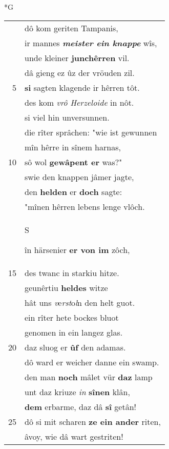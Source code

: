 \documentclass[8pt,a4paper,notitlepage]{article}
\begin{document}
\newpage
\begin{table}[ht]
\begin{minipage}[t]{0.5\linewidth}
\small
\begin{center}*G
\end{center}
\begin{tabular}{rl}
 & dô kom geriten Tampanis,\\ 
 & ir mannes \textit{\textbf{meister ein knappe}} wîs,\\ 
 & unde kleiner \textbf{junchêrren} vil.\\ 
 & dâ gieng ez ûz der vröuden zil.\\ 
5 & \textbf{si} sagten klagende ir hêrren tôt.\\ 
 & des kom \textit{vrô} \textit{Herzeloide} in nôt.\\ 
 & si viel hin unversunnen.\\ 
 & die rîter sprâchen: "wie ist gewunnen\\ 
 & mîn hêrre in sînem harnas,\\ 
10 & sô wol \textbf{gewâpent er} was?"\\ 
 & swie den knappen jâmer jagte,\\ 
 & den \textbf{helden} er \textbf{doch} sagte:\\ 
 & "mînen hêrren lebens lenge vlôch.\\ 
 & \begin{large}S\end{large}în härsenier \textbf{er von im} zôch,\\ 
15 & des twanc in starkiu hitze.\\ 
 & geunêrtiu \textbf{heldes} witze\\ 
 & hât uns \textit{v}e\textit{rst}o\textit{l}n den helt guot.\\ 
 & ein rîter hete bockes bluot\\ 
 & genomen in ein langez glas.\\ 
20 & daz sluog er \textbf{ûf} den adamas.\\ 
 & dô ward er weicher danne ein swamp.\\ 
 & den man \textbf{noch} mâlet vür \textbf{daz} lamp\\ 
 & unt daz kriuze \textit{in} \textbf{sînen} klân,\\ 
 & \textbf{dem} erbarme, daz dâ \textbf{sî} getân!\\ 
25 & dô si mit scharen \textbf{ze ein ander} riten,\\ 
 & âvoy, wie dâ wart gestriten!\\ 

\end{tabular}
\end{minipage}
\end{table}
\end{document}
